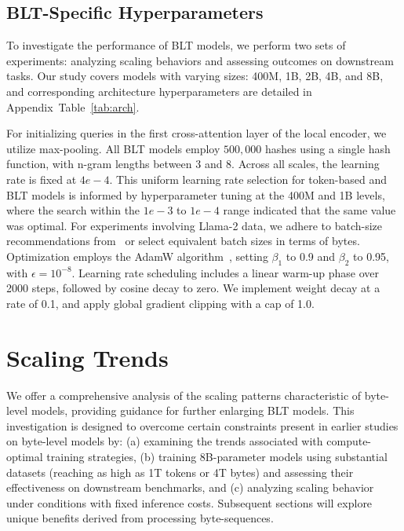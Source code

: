 \subsection{{\textsc BLT}-Specific Hyperparameters} 

To investigate the performance of {\textsc BLT} models, we perform two sets of experiments: analyzing scaling behaviors and assessing outcomes on downstream tasks. Our study covers models with varying sizes: 400M, 1B, 2B, 4B, and 8B, and corresponding architecture hyperparameters are detailed in Appendix~Table~\ref{tab:arch}. 

For initializing queries in the first cross-attention layer of the local encoder, we utilize max-pooling. All {\textsc BLT} models employ $500,000$ hashes using a single hash function, with n-gram lengths between 3 and 8. Across all scales, the learning rate is fixed at $4e-4$. This uniform learning rate selection for token-based and {\textsc BLT} models is informed by hyperparameter tuning at the 400M and 1B levels, where the search within the $1e-3$ to $1e-4$ range indicated that the same value was optimal. For experiments involving Llama-2 data, we adhere to batch-size recommendations from~\cite{dubey2024llama} or select equivalent batch sizes in terms of bytes. Optimization employs the AdamW algorithm~\citep{adamw}, setting $\beta_1$ to 0.9 and $\beta_2$ to 0.95, with $\epsilon=10^{-8}$. Learning rate scheduling includes a linear warm-up phase over 2000 steps, followed by cosine decay to zero. We implement weight decay at a rate of 0.1, and apply global gradient clipping with a cap of 1.0.

\section{Scaling Trends}
\label{section:scaling}

We offer a comprehensive analysis of the scaling patterns characteristic of byte-level models, providing guidance for further enlarging {\textsc BLT} models. This investigation is designed to overcome certain constraints present in earlier studies on byte-level models by: (a) examining the trends associated with compute-optimal training strategies, (b) training 8B-parameter models using substantial datasets (reaching as high as 1T tokens or 4T bytes) and assessing their effectiveness on downstream benchmarks, and (c) analyzing scaling behavior under conditions with fixed inference costs. Subsequent sections will explore unique benefits derived from processing byte-sequences.


